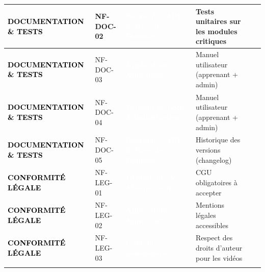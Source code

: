 \begin{longtable}{|P{2.15cm}|P{1.55cm}|P{2.35cm}|P{5.60cm}|P{1.65cm}|P{1.45cm}|}
\textcolor{black}{\textbf{DOCUMENTATION \& TESTS}} & NF-DOC-02 & \textcolor{white}{\textbf{Backend / API \& Base de Données}} & Tests unitaires sur les modules critiques &  &  \\ \hline
{}
\textcolor{black}{\textbf{DOCUMENTATION \& TESTS}} & NF-DOC-03 & \textcolor{white}{\textbf{Application Apprenant}} & Manuel utilisateur (apprenant + admin) &  &  \\ \hline
{}
\textcolor{black}{\textbf{DOCUMENTATION \& TESTS}} & NF-DOC-04 & \textcolor{white}{\textbf{Tableau de bord Administrateur}} & Manuel utilisateur (apprenant + admin) &  &  \\ \hline
{}
\textcolor{black}{\textbf{DOCUMENTATION \& TESTS}} & NF-DOC-05 & \textcolor{white}{\textbf{Backend / API \& Base de Données}} & Historique des versions (changelog) &  &  \\ \hline
{}
\textcolor{black}{\textbf{CONFORMITÉ LÉGALE}} & NF-LEG-01 & \textcolor{white}{\textbf{Utilisateurs \& Abonnements}} & CGU obligatoires à accepter &  &  \\ \hline
{}
\textcolor{black}{\textbf{CONFORMITÉ LÉGALE}} & NF-LEG-02 & \textcolor{white}{\textbf{Application Apprenant}} & Mentions légales accessibles &  &  \\ \hline
{}
\textcolor{black}{\textbf{CONFORMITÉ LÉGALE}} & NF-LEG-03 & \textcolor{white}{\textbf{Contenus pédagogiques}} & Respect des droits d’auteur pour les vidéos &  &  \\ \hline
{}

\end{longtable}
